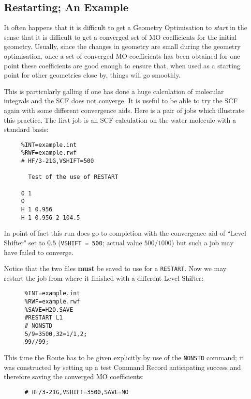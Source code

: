 \subsection{Restarting; An Example}
It often happens that it is difficult to get a Geometry Optimisation
to {\em start} in the sense that it is difficult to get a converged set
of MO coefficients for the initial geometry. Usually, since the 
changes in geometry are small during the geometry optimisation, once a set of
converged MO coefficients has been obtained for one point
these coefficients are good enough to ensure that, 
when used as a starting point for other geometries close by, things will
go smoothly. 

This is particularly galling if one has done a huge calculation of 
molecular integrals and the SCF does not converge. It is useful to be able
to try the SCF again with some different convergence aids. Here is a pair
of jobs which illustrate this practice.
\newpage
The first job is an SCF calculation on the water molecule 
with a standard basis:
\begin{verbatim}
     %INT=example.int
     %RWF=example.rwf
     # HF/3-21G,VSHIFT=500

       Test of the use of RESTART

     0 1
     O
     H 1 0.956
     H 1 0.956 2 104.5

\end{verbatim}
In point of fact this run does go to completion with the convergence
aid of ``Level Shifter" set to $0.5$ ({\tt VSHIFT = 500};
actual value $500/1000$) but such a job may have failed to converge.

Notice that the two files {\bf must} be saved to use for a {\tt RESTART}.
\newpage
Now we may restart the job from where it finished with a different
Level Shifter:

\begin{verbatim}
      %INT=example.int
      %RWF=example.rwf
      %SAVE=H2O.SAVE
      #RESTART L1
      # NONSTD
      5/9=3500,32=1/1,2;
      99//99;

\end{verbatim}

This time the Route has to be given explicitly by use of the {\tt NONSTD}
command; it was constructed by setting up a test Command Record anticipating
success and therefore saving the converged MO coefficients:

\begin{verbatim}
      # HF/3-21G,VSHIFT=3500,SAVE=MO
\end{verbatim}

